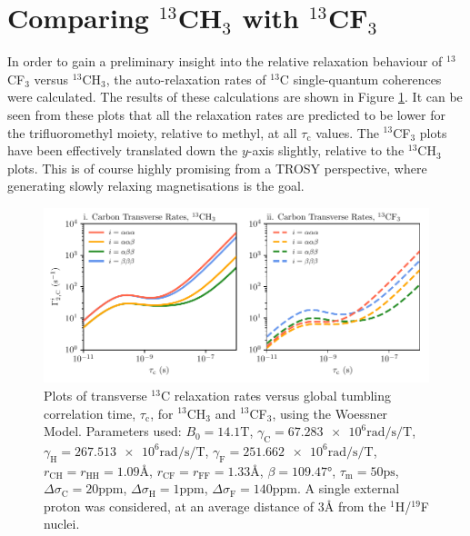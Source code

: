 \section{Comparing $^{13}$CH$_3$ with $^{13}$CF$_3$}
In order to gain a preliminary insight into the relative relaxation behaviour of $^{13}$CF$_3$ versus $^{13}$CH$_3$, the auto-relaxation rates of $^{13}$C single-quantum coherences were calculated. The results of these calculations are shown in Figure \ref{CvF}. It can be seen from these plots that all the relaxation rates are predicted to be lower for the trifluoromethyl moiety, relative to methyl, at all $\tau_{\text{c}}$ values. The $^{13}$CF$_3$ plots have been effectively translated down the $y$-axis slightly, relative to the $^{13}$CH$_3$ plots. This is of course highly promising from a TROSY perspective, where generating slowly relaxing magnetisations is the goal.\\
\begin{figure}
\centering
\includegraphics[scale=0.9]{./Figures/SimonsFigs/CvF.pdf}
\caption{Plots of transverse $^{13}$C relaxation rates versus global tumbling correlation time, $\tau_{\text{c}}$, for $^{13}$CH$_3$ and $^{13}$CF$_3$, using the Woessner Model. Parameters used: $B_0 = \num{14.1} \si{\tesla}$, $\gamma_{\text{C}} = \num{67.283e6} \si{\radian \per \second \per \tesla}$, $\gamma_{\text{H}} = \num{267.513e6} \si{\radian \per \second \per \tesla}$, $\gamma_{\text{F}} = \num{251.662e6} \si{\radian \per \second \per \tesla}$, $r_{\text{CH}} = r_{\text{HH}} = \num{1.09} \si{\angstrom}$, $r_{\text{CF}} = r_{\text{FF}} = \num{1.33} \si{\angstrom}$, $\beta = \ang{109.47}$, $\tau_{\text{m}} = \num{50} \si{\pico \second}$, $\Delta \sigma_{\text{C}} = \num{20} \text{ppm}$, $\Delta \sigma_{\text{H}} = \num{1} \text{ppm}$, $\Delta \sigma_{\text{F}} = \num{140} \text{ppm}$. A single external proton was considered, at an average distance of $\num{3} \si{\angstrom}$ from the $^1$H/$^{19}$F nuclei.}
\label{CvF}
\end{figure}
